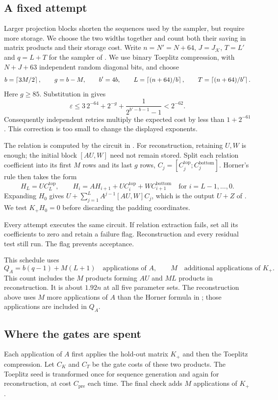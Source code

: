 \documentclass[b5paper, 10pt, abstract=true, captions=tableheading]{scrartcl}
\theoremstyle{plain}
\theoremstyle{definition}
\newcommand{\calK}{\mathcal{K}}
\begin{document}
\subsection{A fixed attempt}
\label{sec:wopt-fixed-attempt}
Larger projection blocks shorten the sequences used by the sampler,
but require more storage. We choose the two widths together and count
both their saving in matrix products and their storage cost.
Write $n=N'=N+64$, $J=J_{\calK}$, $T=L'$ and $q=L+T$ for the sampler
of . We use binary Toeplitz compression,
with $N+J+63$ independent random diagonal bits, and choose
\[
 b=\left\lceil 3M/2\right\rceil,\qquad g=b-M,\qquad b'=4b,\qquad
 L=\left\lceil (n+64)/b\right\rceil,\qquad T=\left\lceil (n+64)/b'\right\rceil.
\]
Here $g\geq85$. Substitution in  gives
\[
 \varepsilon
 \leq3\,2^{-64}+2^{-g}+\frac1{2^{b'-b-1}-1}<2^{-62}.
\]
Consequently independent retries multiply the expected cost by less than
$1+2^{-61}$. This correction is too small to change the displayed exponents.

The relation is computed by the circuit in .
For reconstruction, retaining $U,W$ is enough; the initial block $[AU,W]$
need not remain stored. Split each relation coefficient into its first
$M$ rows and its last $g$ rows,
$C_j=[C_j^{\mathrm{top}};C_j^{\mathrm{bottom}}]$. Horner's rule then takes
the form
\begin{equation}\label{eq:wopt-reconstruction}
 H_L=UC_L^{\mathrm{top}},\qquad
 H_i=AH_{i+1}+UC_i^{\mathrm{top}}+WC_{i+1}^{\mathrm{bottom}}
 \quad\text{for }i=L-1,\ldots,0.
\end{equation}
Expanding $H_0$ gives $U+\sum_{j=1}^L A^{j-1}[AU,W]C_j$, which is the
output $U+Z$ of . We test $K_+H_0=0$ before
discarding the padding coordinates.

Every attempt executes the same circuit. If relation extraction fails,
set all its coefficients to zero and retain a failure flag. Reconstruction
and every residual test still run. The flag prevents acceptance.

This schedule uses
\[
 Q_A=b(q-1)+M(L+1)\quad\text{applications of }A,
 \qquad M\quad\text{additional applications of }K_+.
\]
This count includes the $M$ products forming $AU$ and $ML$ products in
reconstruction. It is about $1.92n$ at all five parameter sets. The
reconstruction above uses $M$ more applications of $A$ than the Horner
formula in ; those applications are
included in $Q_A$.

\subsection{Where the gates are spent}
\label{sec:wopt-cost-decomposition}
Each application of $A$ first applies the hold-out matrix $K_+$ and then
the Toeplitz compression. Let $C_K$ and $C_T$ be the gate costs of these
two products. The Toeplitz seed is transformed once for sequence generation
and again for reconstruction, at cost $C_{\mathrm{pre}}$ each time.
The final check adds $M$ applications of $K_+$.
\end{document}
